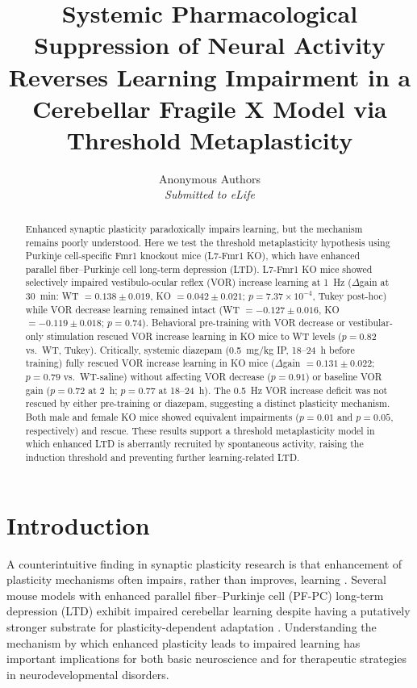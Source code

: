 \documentclass[11pt]{article}
\title{Systemic Pharmacological Suppression of Neural Activity Reverses Learning Impairment in a Cerebellar Fragile X Model via Threshold Metaplasticity}
\author{
  Anonymous Authors\\
  \textit{Submitted to eLife}
}
\date{}
\begin{document}
\maketitle

\begin{abstract}
Enhanced synaptic plasticity paradoxically impairs learning, but the mechanism remains poorly understood. Here we test the threshold metaplasticity hypothesis using Purkinje cell-specific Fmr1 knockout mice (L7-Fmr1 KO), which have enhanced parallel fiber--Purkinje cell long-term depression (LTD). L7-Fmr1 KO mice showed selectively impaired vestibulo-ocular reflex (VOR) increase learning at 1~Hz ($\Delta$gain at 30~min: WT $= 0.138 \pm 0.019$, KO $= 0.042 \pm 0.021$; $p = 7.37 \times 10^{-4}$, Tukey post-hoc) while VOR decrease learning remained intact (WT $= -0.127 \pm 0.016$, KO $= -0.119 \pm 0.018$; $p = 0.74$). Behavioral pre-training with VOR decrease or vestibular-only stimulation rescued VOR increase learning in KO mice to WT levels ($p = 0.82$ vs.\ WT, Tukey). Critically, systemic diazepam (0.5~mg/kg IP, 18--24~h before training) fully rescued VOR increase learning in KO mice ($\Delta$gain $= 0.131 \pm 0.022$; $p = 0.79$ vs.\ WT-saline) without affecting VOR decrease ($p = 0.91$) or baseline VOR gain ($p = 0.72$ at 2~h; $p = 0.77$ at 18--24~h). The 0.5~Hz VOR increase deficit was not rescued by either pre-training or diazepam, suggesting a distinct plasticity mechanism. Both male and female KO mice showed equivalent impairments ($p = 0.01$ and $p = 0.05$, respectively) and rescue. These results support a threshold metaplasticity model in which enhanced LTD is aberrantly recruited by spontaneous activity, raising the induction threshold and preventing further learning-related LTD.
\end{abstract}

\section{Introduction}

A counterintuitive finding in synaptic plasticity research is that enhancement of plasticity mechanisms often impairs, rather than improves, learning \citep{hansel2001beyond, titley2017toward}. Several mouse models with enhanced parallel fiber--Purkinje cell (PF-PC) long-term depression (LTD) exhibit impaired cerebellar learning despite having a putatively stronger substrate for plasticity-dependent adaptation \citep{koekkoek2005deletion, huber2002altered}. Understanding the mechanism by which enhanced plasticity leads to impaired learning has important implications for both basic neuroscience and for therapeutic strategies in neurodevelopmental disorders.
\end{document}
